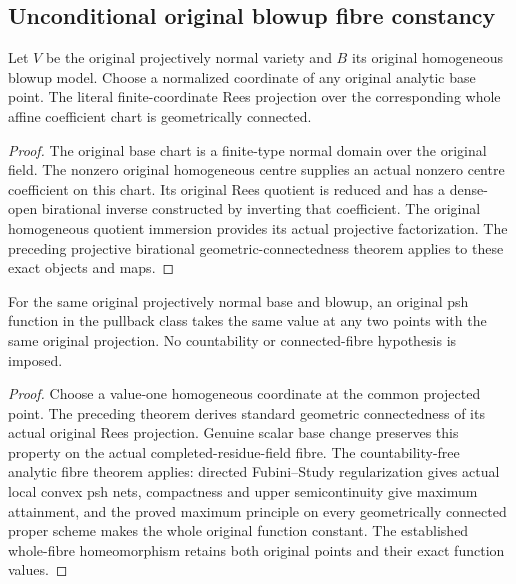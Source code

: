 \subsection{Unconditional original blowup fibre constancy}

\begin{theorem}
\label{thm:fc-original-blowup-rees-geometrically-connected}
\leanok
{}
Let $V$ be the original projectively normal variety and $B$ its original
homogeneous blowup model. Choose a normalized coordinate of any original
analytic base point. The literal finite-coordinate Rees projection over
the corresponding whole affine coefficient chart is geometrically connected.
\end{theorem}
\begin{proof}
The original base chart is a finite-type normal domain over the original
field. The nonzero original homogeneous centre supplies an actual
nonzero centre coefficient on this chart. Its original Rees quotient is
reduced and has a dense-open birational inverse constructed by inverting
that coefficient. The original homogeneous quotient immersion provides
its actual projective factorization. The preceding projective
birational geometric-connectedness theorem applies to these exact
objects and maps.
\end{proof}

\begin{theorem}
\label{thm:fc-original-blowup-fibre-constancy}
\leanok
{}
For the same original projectively normal base and blowup, an original
psh function in the pullback class takes the same value at any two
points with the same original projection. No countability or
connected-fibre hypothesis is imposed.
\end{theorem}
\begin{proof}
Choose a value-one homogeneous coordinate at the common projected
point. The preceding theorem derives standard geometric connectedness
of its actual original Rees projection. Genuine scalar base change
preserves this property on the actual completed-residue-field fibre.
The countability-free analytic fibre theorem applies: directed
Fubini--Study regularization gives actual local convex psh nets,
compactness and upper semicontinuity give maximum attainment, and the
proved maximum principle on every geometrically connected proper
scheme makes the whole original function constant. The established
whole-fibre homeomorphism retains both original points and their exact
function values.
\end{proof}


